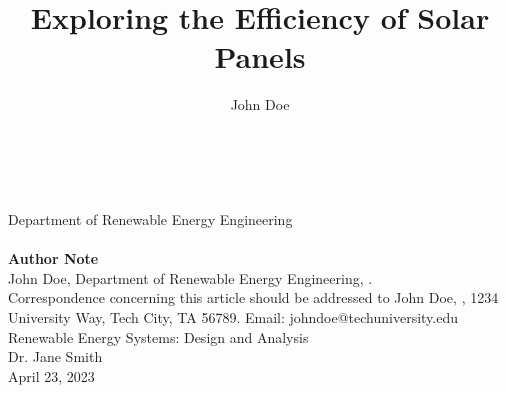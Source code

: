 \documentclass{article}
\title{Exploring the Efficiency of Solar Panels}
\author{John Doe}
\affiliation{Tech University}
\begin{document}
\begin{titlepage}
\thispagestyle{empty} %
\centering
\vspace*{40mm} %
{\Large \textbf{\MakeUppercase{\thetitle}}}\\
\vspace{10mm} %
{\large \theauthor}\\
\vspace{5mm} %
{\large Department of Renewable Energy Engineering}\\
{\large \theaffiliation}\\
\vspace{20mm} %
{\large \textbf{Author Note}}\\
\vspace{5mm} %
John Doe, Department of Renewable Energy Engineering, \theaffiliation.\\
Correspondence concerning this article should be addressed to John Doe, \theaffiliation, 1234 University Way, Tech City, TA 56789. Email: johndoe@techuniversity.edu\\
\vspace{10mm} %
{\large Renewable Energy Systems: Design and Analysis}\\
\vspace{5mm} %
{\large Dr. Jane Smith}\\
\vspace{5mm} %
{\large April 23, 2023}\\
\end{titlepage}

\end{document}
